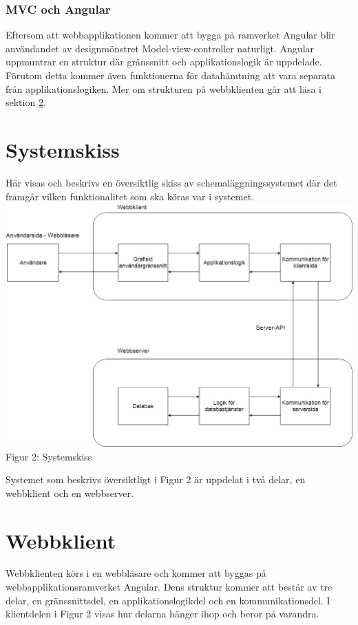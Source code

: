 \documentclass[a4paper,10pt]{article}
\begin{document}
\subsubsection{MVC och Angular}

Eftersom att webbapplikationen kommer att bygga på ramverket Angular blir användandet av designmönstret Model-view-controller naturligt. Angular uppmuntrar en struktur där gränssnitt och applikationslogik är uppdelade. Förutom detta kommer även funktionerna för datahämtning att vara separata från applikationslogiken. Mer om strukturen på webbklienten går att läsa i sektion \ref{sec:webbklient}.

\clearpage
\section{Systemskiss}
\label{sec:Systemskiss}
Här visas och beskrivs en översiktlig skiss av schemaläggningssystemet där det framgår vilken funktionalitet som ska köras var i systemet. \\
\includegraphics[width=\textwidth,height=.7\textheight]{Systemskiss.png}\\
Figur 2: Systemskiss

Systemet som beskrivs översiktligt i Figur 2 är uppdelat i två delar, en webbklient och en webbserver.
\section{Webbklient}
\label{sec:webbklient}
Webbklienten körs i en webbläsare och kommer att byggas på webbapplikationsramverket Angular. Dens struktur kommer att består av tre delar, en gränssnittsdel, en applikationslogikdel och en kommunikationsdel. I klientdelen i Figur 2 visas hur delarna hänger ihop och beror på varandra.
\end{document}
